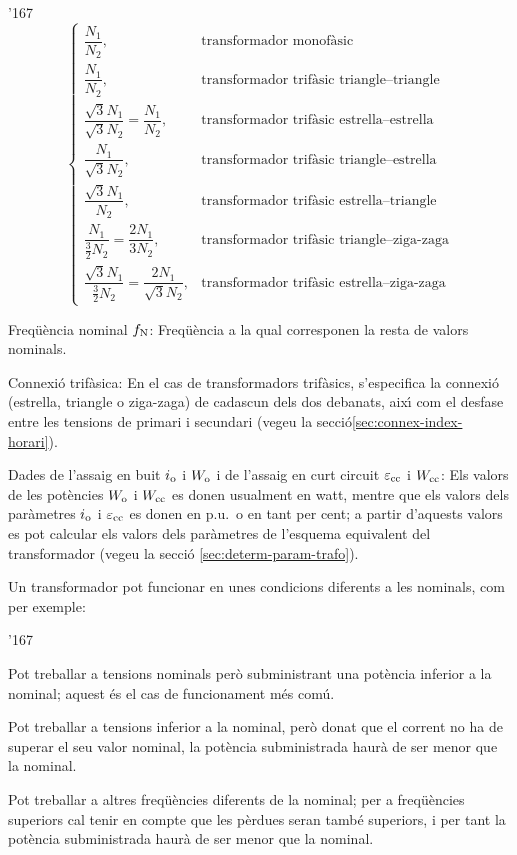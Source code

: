 \begin{dinglist}{'167}
\begin{equation}
\begin{cases}
        \dfrac{N_1}{N_2}, & \text{transformador monof\`{a}sic} \\[0.4cm]
        \dfrac{N_1}{N_2}, & \text{transformador trif\`{a}sic triangle--triangle} \\[0.4cm]
        \dfrac{\sqrt{3}N_1}{\sqrt{3}N_2} = \dfrac{N_1}{N_2}, & \text{transformador trif\`{a}sic estrella--estrella} \\[0.4cm]
        \dfrac{N_1}{\sqrt{3}N_2}, & \text{transformador trif\`{a}sic triangle--estrella} \\[0.4cm]
        \dfrac{\sqrt{3}N_1}{N_2}, & \text{transformador trif\`{a}sic estrella--triangle} \\[0.4cm]
        \dfrac{N_1}{\frac{3}{2}N_2} = \dfrac{2 N_1}{3 N_2}, & \text{transformador trif\`{a}sic triangle--ziga-zaga} \\[0.4cm]
        \dfrac{\sqrt{3}N_1}{\frac{3}{2}N_2} = \dfrac{2 N_1}{\sqrt{3} N_2}, & \text{transformador trif\`{a}sic estrella--ziga-zaga}
         \end{cases}
       \end{equation}
   \item Freq\"{u}\`{e}ncia nominal $f_\mathrm{N}$: Freq\"{u}\`{e}ncia a la qual corresponen la resta de valors nominals.
   \item Connexi\'{o} trif\`{a}sica: En el cas de transformadors trif\`{a}sics, s'especifica la connexi\'{o} (estrella, triangle o ziga-zaga) de cadascun dels dos debanats, aix\'{\i} com el desfase entre les tensions de primari i secundari (vegeu la secci\'{o}\vref{sec:connex-index-horari}).
   \item Dades de l'assaig en buit $i_\mathrm{o}$ i $W_\mathrm{o}$ i de l'assaig en curt circuit $\varepsilon_\mathrm{cc}$ i $W_\mathrm{cc}$: Els valors de les pot\`{e}ncies $W_\mathrm{o}$ i $W_\mathrm{cc}$ es donen
usualment en watt, mentre que els valors dels par\`{a}metres $i_\mathrm{o}$
i $\varepsilon_\mathrm{cc}$ es donen en p.u.\ o en tant per cent; a partir d'aquests valors es pot calcular els valors dels par\`{a}metres de l'esquema equivalent del transformador  (vegeu la secci\'{o} \vref{sec:determ-param-trafo}).
\end{dinglist}

Un transformador pot funcionar en unes condicions diferents a les nominals, com per exemple:
\begin{dinglist}{'167}
   \item Pot treballar a tensions nominals per\`{o} subministrant una pot\`{e}ncia inferior a la nominal; aquest \'{e}s el cas de funcionament m\'{e}s com\'{u}.
   \item Pot treballar a tensions inferior a la nominal, per\`{o} donat que el corrent no ha de superar el seu valor nominal, la pot\`{e}ncia subministrada haur\`{a} de ser menor que la nominal.
   \item Pot treballar a altres freq\"{u}\`{e}ncies diferents de la nominal; per a freq\"{u}\`{e}ncies superiors cal tenir en compte que les p\`{e}rdues seran tamb\'{e} superiors, i per tant la pot\`{e}ncia subministrada haur\`{a} de ser menor que la nominal.
\end{dinglist}

